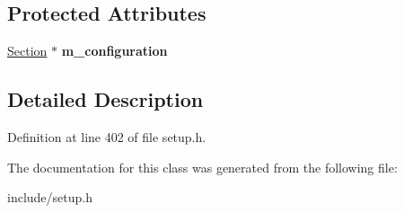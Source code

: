 \subsection*{Protected Attributes}
\begin{DoxyCompactItemize}
\item 
\hypertarget{classModule__base_aceab15faaa79b216f6d417b0c80fdce6}{\hyperlink{classSection}{Section} $\ast$ {\bfseries m\-\_\-configuration}}\label{classModule__base_aceab15faaa79b216f6d417b0c80fdce6}

\end{DoxyCompactItemize}


\subsection{Detailed Description}


Definition at line 402 of file setup.\-h.



The documentation for this class was generated from the following file\-:\begin{DoxyCompactItemize}
\item 
include/setup.\-h\end{DoxyCompactItemize}
